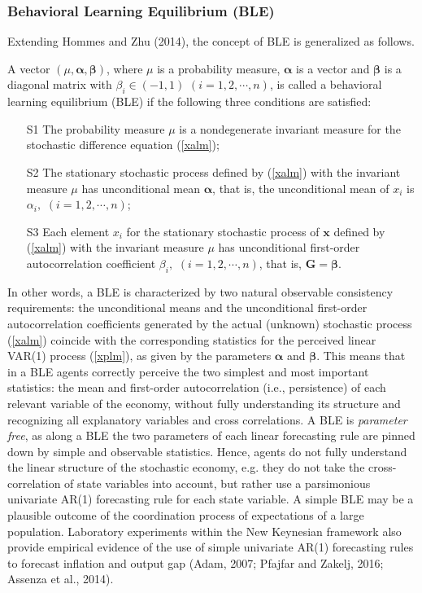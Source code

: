 \subsubsection*{Behavioral Learning Equilibrium (BLE)}
Extending Hommes and Zhu (2014), the concept of BLE is generalized as
follows.
\begin{defn}
A vector $(\mu, \pmb\alpha, \pmb\beta)$, where $\mu$ is a probability
measure, $\pmb\alpha$ is a vector and $\pmb\beta$  is a diagonal matrix with
 $\beta_i\in(-1,1)\,\,(i=1,2,\cdots,n)$, is called a behavioral learning equilibrium (BLE)  if the following three conditions are satisfied:
\begin{itemize}
\item[S1] The probability measure $\mu$ is a nondegenerate invariant
measure for the stochastic difference equation (\ref{xalm});
\item[S2] The stationary stochastic process defined by (\ref{xalm}) with the invariant
measure $\mu$ has unconditional mean $\pmb\alpha$, that is,
the unconditional mean of $x_i$ is $\alpha_i,\,\, (i=1,2,\cdots,n)$;
\item[S3] Each element $x_i$ for the stationary stochastic process of $\pmb x$ defined by (\ref{xalm}) with the invariant
measure $\mu$ has unconditional first-order autocorrelation
coefficient $\beta_i, \,\, (i=1,2,\cdots,n)$, that is, ${\pmb G}={\pmb\beta}$.
\end{itemize}
\end{defn}
In other words, a BLE is characterized by two natural observable
consistency requirements: the unconditional means and the
unconditional first-order autocorrelation coefficients generated by
the actual (unknown) stochastic process (\ref{xalm}) coincide with
the corresponding statistics for the perceived linear VAR(1) process
(\ref{xplm}), as given by the parameters $\pmb\alpha$ and
$\pmb\beta$. This means that in a BLE agents correctly perceive the
two simplest and most important statistics: the mean and first-order
autocorrelation (i.e., persistence) of each relevant variable of the economy,
without fully understanding its structure and recognizing all
explanatory variables and cross correlations. A BLE is \emph{parameter free}, as along a BLE the two parameters of each linear forecasting rule are pinned down by simple and observable statistics. Hence, agents do not fully understand the linear structure of the stochastic economy, e.g. they do not take the cross-correlation of state variables into account, but rather use a parsimonious univariate AR(1) forecasting rule for each state variable. A simple BLE may be a plausible outcome of the coordination process of expectations of a large population. Laboratory experiments within the New Keynesian framework also provide empirical evidence of the use of simple univariate AR(1) forecasting rules to forecast inflation and output gap (Adam, 2007; Pfajfar and Zakelj, 2016; Assenza et al., 2014).

